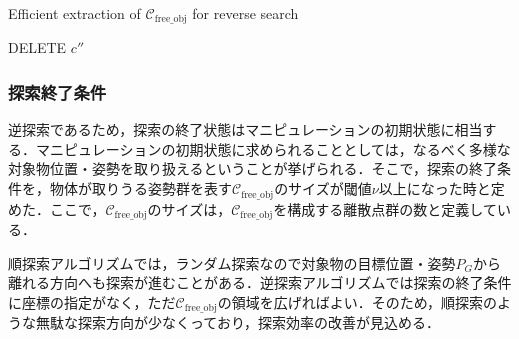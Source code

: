 \documentclass[a4paper,twoside,12pt,papersize, dvipdfmx]{iirthesis}
\begin{document}
\begin{algorithm}[tb]
\caption{Efficient extraction of $\mathcal{C}_{\mathrm{free\_obj}}$ for reverse search}
\label{algo::planner::revdfs}
\begin{algorithmic}[1]
\EndIf
\EndFor
{}
\EndFor
 DELETE  $c''$
\EndFor
\end{algorithmic}
\end{algorithm}

\subsubsection{探索終了条件}
逆探索であるため，探索の終了状態はマニピュレーションの初期状態に相当する．マニピュレーションの初期状態に求められることとしては，なるべく多様な対象物位置・姿勢を取り扱えるということが挙げられる．そこで，探索の終了条件を，物体が取りうる姿勢群を表す$\mathcal{C}_{\mathrm{free\_obj}}$のサイズが閾値$\nu$以上になった時と定めた．ここで，$\mathcal{C}_{\mathrm{free\_obj}}$のサイズは，$\mathcal{C}_{\mathrm{free\_obj}}$を構成する離散点群の数と定義している．\par
順探索アルゴリズムでは，ランダム探索なので対象物の目標位置・姿勢$P_G$から離れる方向へも探索が進むことがある．逆探索アルゴリズムでは探索の終了条件に座標の指定がなく，ただ$\mathcal{C}_{\mathrm{free\_obj}}$の領域を広げればよい．そのため，順探索のような無駄な探索方向が少なくっており，探索効率の改善が見込める．
\end{document}
